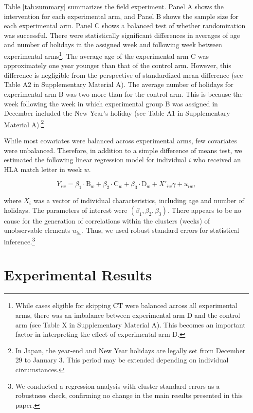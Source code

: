 \documentclass[12pt, a4paper]{article}
\begin{document}
Table \ref{tab:summary} summarizes the field experiment. Panel A shows the intervention for each experimental arm, and Panel B shows the sample size for each experimental arm. Panel C shows a balanced test of whether randomization was successful. There were statistically significant differences in averages of age and number of holidays in the assigned week and following week between experimental arms\footnote{While cases eligible for skipping CT were balanced across all experimental arms, there was an imbalance between experimental arm D and the control arm (see Table X in Supplementary Material A). This becomes an important factor in interpreting the effect of experimental arm D.}. The average age of the experimental arm C was approximately one year younger than that of the control arm. However, this difference is negligible from the perspective of standardized mean difference (see Table A2 in Supplementary Material A). The average number of holidays for experimental arm B was two more than for the control arm. This is because the week following the week in which experimental group B was assigned in December included the New Year's holiday (see Table A1 in Supplementary Material A).\footnote{In Japan, the year-end and New Year holidays are legally set from December 29 to January 3. This period may be extended depending on individual circumstances.}

While most covariates were balanced across experimental arms, few covariates were unbalanced. Therefore, in addition to a simple difference of means test, we estimated the following linear regression model for individual \(i\) who received an HLA match letter in week \(w\).

\begin{equation}
  Y_{iw} =
  \beta_1 \cdot \text{B}_{w} + \beta_2 \cdot \text{C}_{w} + \beta_3 \cdot \text{D}_{w}
  + X'_{iw} \gamma + u_{iw}, \label{eq:reg}
\end{equation}

\noindent
where \(X_i\) was a vector of individual characteristics, including age and number of holidays. The parameters of interest were \((\beta_1, \beta_2, \beta_3)\). There appears to be no cause for the generation of correlations within the clusters (weeks) of unobservable elements \(u_{iw}\). Thus, we used robust standard errors for statistical inference.\footnote{We conducted a regression analysis with cluster standard errors as a robustness check, confirming no change in the main results presented in this paper.}

\hypertarget{result}{%
\section{Experimental Results}\label{result}}
\end{document}
